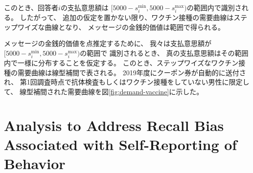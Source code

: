 \documentclass[
  11pt,
  a4paper,
]{article}
\begin{document}
このとき、回答者\(i\)の支払意思額は
\([5000 - s_i^{\text{min}}, 5000 - s_i^{\text{max}})\)の範囲内で識別される。
したがって、
追加の仮定を置かない限り、ワクチン接種の需要曲線はステップワイズな曲線となり、
メッセージの金銭的価値は範囲で得られる。

メッセージの金銭的価値を点推定するために、
我々は支払意思額が
\([5000 - s_i^{\text{min}}, 5000 - s_i^{\text{max}})\)の範囲で
識別されるとき、
真の支払意思額はその範囲内で一様に分布することを仮定する。
このとき、ステップワイズなワクチン接種の需要曲線は線型補間で表される。
2019年度にクーポン券が自動的に送付され、
第1回調査時点で抗体検査もしくはワクチン接種をしていない男性に限定して、
線型補間された需要曲線を図\ref{fig:demand-vaccine}に示した。

\clearpage

\hypertarget{analysis-to-address-recall-bias-associated-with-self-reporting-of-behavior}{%
\section{Analysis to Address Recall Bias Associated with Self-Reporting of Behavior}\label{analysis-to-address-recall-bias-associated-with-self-reporting-of-behavior}}
\end{document}

